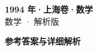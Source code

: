 \documentclass[zihao=-4, a4paper]{ctexart}
\begin{document}
\begin{center}
  {\Large\bfseries 1994 年·上海卷·数学}\\[4pt]
  {\large 数学 · 解析版}
\end{center}
\medskip
{}

\clearpage
{}
\begin{center}{\Large\bfseries 参考答案与详细解析}\end{center}
\medskip

\end{document}
